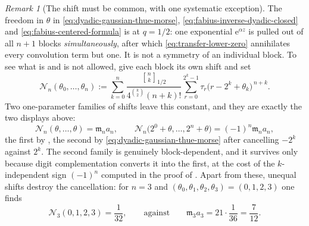 \documentclass[11pt,oneside,openany]{book}
\theoremstyle{definition}
\theoremstyle{remark}
\newtheorem{remark}[remark]{Remark}
\newcommand{\Qbinom}[3]{\genfrac{[}{]}{0pt}{}{#1}{#2}_{#3}}
\newcommand{\e}{\mathrm e}
\newcommand{\defeq}{\mathrel{:=}}
\begin{document}
\begin{remark}[The shift must be common, with one systematic exception]\label{rem:dyadic-shift-common}
The freedom in $\theta$ in \eqref{eq:dyadic-gaussian-thue-morse}, \eqref{eq:fabius-inverse-dyadic-closed} and \eqref{eq:fabius-centered-formula} is  at $q=1/2$: one exponential $\e^{\alpha z}$ is pulled out of all $n+1$ blocks \emph{simultaneously}, after which \eqref{eq:transfer-lower-zero} annihilates every convolution term but one.  It is not a symmetry of an individual block.  To see what is and is not allowed, give each block its own shift and set
\begin{equation}\label{eq:dyadic-numerator-blockwise}
 \mathcal N_n(\theta_0,\ldots,\theta_n)
 \defeq\sum_{k=0}^{n}
 \frac{\Qbinom nk{1/2}}{4^{\binom k2}(n+k)!}
 \sum_{r=0}^{2^k-1}\tau_r\bigl(r-2^k+\theta_k\bigr)^{\,n+k}.
\end{equation}
Two one-parameter families of shifts leave this constant, and they are exactly the two displays above:
\[
 \mathcal N_n(\theta,\ldots,\theta)=\mathfrak m_na_n,
 \qquad
 \mathcal N_n\bigl(2^0+\theta,\ldots,2^n+\theta\bigr)=(-1)^n\mathfrak m_na_n ,
\]
the first by , the second by \eqref{eq:dyadic-gaussian-thue-morse} after cancelling $-2^k$ against $2^k$.  The second family is genuinely block-dependent, and it survives only because digit complementation converts it into the first, at the cost of the $k$-independent sign $(-1)^n$ computed in the proof of .  Apart from these, unequal shifts destroy the cancellation: for $n=3$ and $(\theta_0,\theta_1,\theta_2,\theta_3)=(0,1,2,3)$ one finds
\[
 \mathcal N_3(0,1,2,3)=\frac1{32},
 \qquad\text{against}\qquad
 \mathfrak m_3a_3=21\cdot\frac1{36}=\frac7{12}.
\]
\end{remark}
\end{document}
